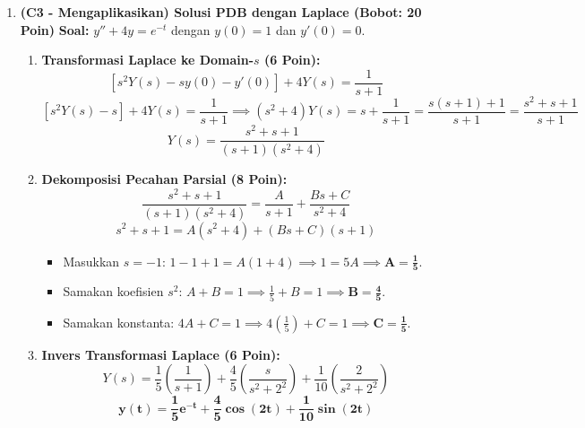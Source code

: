 \documentclass[11pt,a4paper]{article}
\begin{document}
\begin{enumerate}[label=\textbf{Soal \arabic*.}]
    \item \textbf{(C3 - Mengaplikasikan) Solusi PDB dengan Laplace (Bobot: 20 Poin)}
    \textbf{Soal:} $y'' + 4y = e^{-t}$ dengan $y(0) = 1$ dan $y'(0) = 0$.
    \begin{tcolorbox}[colback=green!5!white,colframe=green!60!black,title=Solusi Model:]
    \begin{enumerate}
        \item \textbf{Transformasi Laplace ke Domain-$s$ (6 Poin):}
        $$ [s^2 Y(s) - s y(0) - y'(0)] + 4Y(s) = \frac{1}{s+1} $$
        $$ [s^2 Y(s) - s] + 4Y(s) = \frac{1}{s+1} \implies (s^2 + 4)Y(s) = s + \frac{1}{s+1} = \frac{s(s+1) + 1}{s+1} = \frac{s^2 + s + 1}{s+1} $$
        $$ Y(s) = \frac{s^2 + s + 1}{(s+1)(s^2 + 4)} $$
        \item \textbf{Dekomposisi Pecahan Parsial (8 Poin):}
        $$ \frac{s^2 + s + 1}{(s+1)(s^2 + 4)} = \frac{A}{s+1} + \frac{B s + C}{s^2 + 4} $$
        $$ s^2 + s + 1 = A(s^2 + 4) + (Bs + C)(s+1) $$
        \begin{itemize}
            \item Masukkan $s = -1$: $1 - 1 + 1 = A(1+4) \implies 1 = 5A \implies \mathbf{A = \frac{1}{5}}$.
            \item Samakan koefisien $s^2$: $A + B = 1 \implies \frac{1}{5} + B = 1 \implies \mathbf{B = \frac{4}{5}}$.
            \item Samakan konstanta: $4A + C = 1 \implies 4\left(\frac{1}{5}\right) + C = 1 \implies \mathbf{C = \frac{1}{5}}$.
        \end{itemize}
        \item \textbf{Invers Transformasi Laplace (6 Poin):}
        $$ Y(s) = \frac{1}{5}\left(\frac{1}{s+1}\right) + \frac{4}{5}\left(\frac{s}{s^2 + 2^2}\right) + \frac{1}{10}\left(\frac{2}{s^2 + 2^2}\right) $$
        $$ \mathbf{y(t) = \frac{1}{5}e^{-t} + \frac{4}{5}\cos(2t) + \frac{1}{10}\sin(2t)} $$
    \end{enumerate}
    \end{tcolorbox}

    \newpage


\end{enumerate}
\end{document}

